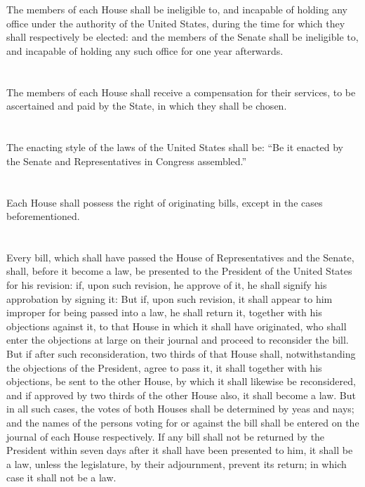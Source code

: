 \documentclass{constitution}
\begin{document}
\section{}
The members of each House shall be ineligible to, and incapable of holding any office under the authority of the United States, during the time for which they shall respectively be elected:
and the members of the Senate shall be ineligible to, and incapable of holding any such office for one year afterwards.

\section{}
The members of each House shall receive a compensation for their services, to be ascertained and paid by the State, in which they shall be chosen.

\section{}
The enacting style of the laws of the United States shall be:
“Be it enacted by the Senate and Representatives in Congress assembled.”

\section{}
Each House shall possess the right of originating bills, except in the cases beforementioned.

\section{}
Every bill, which shall have passed the House of Representatives and the Senate, shall, before it become a law, be presented to the President of the United States for his revision:
if, upon such revision, he approve of it, he shall signify his approbation by signing it:
But if, upon such revision, it shall appear to him improper for being passed into a law, he shall return it, together with his objections against it, to that House in which it shall have originated,
who shall enter the objections at large on their journal and proceed to reconsider the bill.
But if after such reconsideration, two thirds of that House shall, notwithstanding the objections of the President, agree to pass it,
it shall together with his objections, be sent to the other House, by which it shall likewise be reconsidered,
and if approved by two thirds of the other House also, it shall become a law.
But in all such cases, the votes of both Houses shall be determined by yeas and nays;
and the names of the persons voting for or against the bill shall be entered on the journal of each House respectively.
If any bill shall not be returned by the President within seven days after it shall have been presented to him,
it shall be a law, unless the legislature, by their adjournment, prevent its return;
in which case it shall not be a law.
\end{document}
